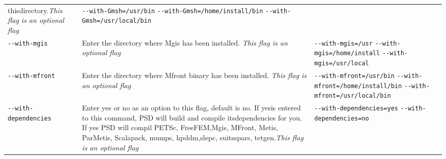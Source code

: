 \begin{longtable}[]{@{}lll@{}}
\begin{minipage}[t]{0.39\columnwidth}
thisdirectory.\emph{This flag is an optional flag}\strut
\end{minipage} & \begin{minipage}[t]{0.39\columnwidth}\raggedright\strut
\lstinline!--with-Gmsh=/usr/bin!
\lstinline!--with-Gmsh=/home/install/bin!
\lstinline!--with-Gmsh=/usr/local/bin!\strut
\end{minipage}\tabularnewline
\begin{minipage}[t]{0.14\columnwidth}\raggedright\strut
\lstinline!--with-mgis!\strut
\end{minipage} & \begin{minipage}[t]{0.39\columnwidth}\raggedright\strut
Enter the directory where Mgis has been installed. \emph{This flag is an
optional flag}\strut
\end{minipage} & \begin{minipage}[t]{0.39\columnwidth}\raggedright\strut
\lstinline!--with-mgis=/usr! \lstinline!--with-mgis=/home/install!
\lstinline!--with-mgis=/usr/local!\strut
\end{minipage}\tabularnewline
\begin{minipage}[t]{0.14\columnwidth}\raggedright\strut
\lstinline!--with-mfront!\strut
\end{minipage} & \begin{minipage}[t]{0.39\columnwidth}\raggedright\strut
Enter the directory where Mfront binary has been installed. \emph{This
flag is an optional flag}\strut
\end{minipage} & \begin{minipage}[t]{0.39\columnwidth}\raggedright\strut
\lstinline!--with-mfront=/usr/bin!
\lstinline!--with-mfront=/home/install/bin!
\lstinline!--with-mfront=/usr/local/bin!\strut
\end{minipage}\tabularnewline
\begin{minipage}[t]{0.14\columnwidth}\raggedright\strut
\lstinline!--with-dependencies!\strut
\end{minipage} & \begin{minipage}[t]{0.39\columnwidth}\raggedright\strut
Enter yes or no as an option to this flag, default is no. If yesis
entered to this command, PSD will build and compile itsdependencies for
you. If yes PSD will compil PETSc, FreeFEM,Mgis, MFront, Metis,
ParMetis, Scalapack, mumps, hpddm,slepc, suitsspars, tetgen.\emph{This
flag is an optional flag}\strut
\end{minipage} & \begin{minipage}[t]{0.39\columnwidth}\raggedright\strut
\lstinline!--with-dependencies=yes! \lstinline!--with-dependencies=no!
\strut
\end{minipage}\tabularnewline
\bottomrule
\end{longtable}

